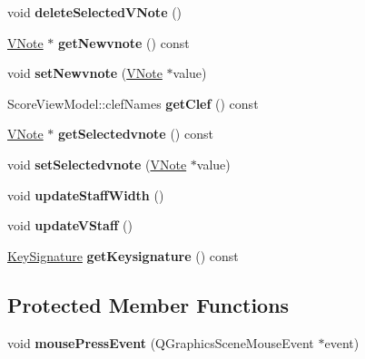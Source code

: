 \begin{DoxyCompactItemize}
\item 
\hypertarget{class_v_staff_ac7e53a5a6092b7b57ab0a1f36d2357d9}{}void {\bfseries delete\+Selected\+V\+Note} ()\label{class_v_staff_ac7e53a5a6092b7b57ab0a1f36d2357d9}

\item 
\hypertarget{class_v_staff_ad42533b9604fd8abec281dcf6d1be8ee}{}\hyperlink{class_v_note}{V\+Note} $\ast$ {\bfseries get\+Newvnote} () const \label{class_v_staff_ad42533b9604fd8abec281dcf6d1be8ee}

\item 
\hypertarget{class_v_staff_a2b8d021fd00eaf7e4fda38a2c58b8d9e}{}void {\bfseries set\+Newvnote} (\hyperlink{class_v_note}{V\+Note} $\ast$value)\label{class_v_staff_a2b8d021fd00eaf7e4fda38a2c58b8d9e}

\item 
\hypertarget{class_v_staff_aaf1790a96768e184d2b6c1299d4eb230}{}Score\+View\+Model\+::clef\+Names {\bfseries get\+Clef} () const \label{class_v_staff_aaf1790a96768e184d2b6c1299d4eb230}

\item 
\hypertarget{class_v_staff_ae38cc7590d13e6992e996c91dd209cb4}{}\hyperlink{class_v_note}{V\+Note} $\ast$ {\bfseries get\+Selectedvnote} () const \label{class_v_staff_ae38cc7590d13e6992e996c91dd209cb4}

\item 
\hypertarget{class_v_staff_a2c1531ee4734bccf5ffe7bd66f988583}{}void {\bfseries set\+Selectedvnote} (\hyperlink{class_v_note}{V\+Note} $\ast$value)\label{class_v_staff_a2c1531ee4734bccf5ffe7bd66f988583}

\item 
\hypertarget{class_v_staff_ac96715515c3f55229ba114293ece82fd}{}void {\bfseries update\+Staff\+Width} ()\label{class_v_staff_ac96715515c3f55229ba114293ece82fd}

\item 
\hypertarget{class_v_staff_aa4d00861f977630d44c8c19a09c05da5}{}void {\bfseries update\+V\+Staff} ()\label{class_v_staff_aa4d00861f977630d44c8c19a09c05da5}

\item 
\hypertarget{class_v_staff_a95b415e2f53afe972263f62149203710}{}\hyperlink{class_key_signature}{Key\+Signature} {\bfseries get\+Keysignature} () const \label{class_v_staff_a95b415e2f53afe972263f62149203710}

\end{DoxyCompactItemize}
\subsection*{Protected Member Functions}
\begin{DoxyCompactItemize}
\item 
\hypertarget{class_v_staff_a570bacf43a4ba401525bda3b037d3c0d}{}void {\bfseries mouse\+Press\+Event} (Q\+Graphics\+Scene\+Mouse\+Event $\ast$event)\label{class_v_staff_a570bacf43a4ba401525bda3b037d3c0d}

\end{DoxyCompactItemize}


